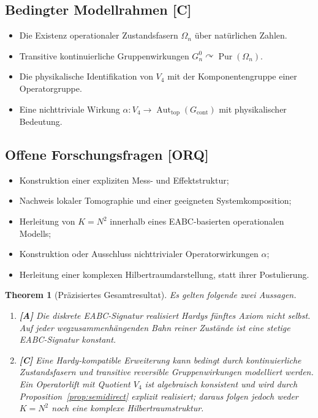 \documentclass[11pt,a4paper,reqno]{amsart}
\newtheorem{theorem}{Theorem}[section]
\theoremstyle{definition}
\theoremstyle{remark}
\newcommand{\Pur}{\operatorname{Pur}}
\newcommand{\Aut}{\operatorname{Aut}}
\newcommand{\StatusA}{\textnormal{\textbf{[A]}}}
\newcommand{\StatusC}{\textnormal{\textbf{[C]}}}
\newcommand{\StatusORQ}{\textnormal{\textbf{[ORQ]}}}
\begin{document}
\subsection*{Bedingter Modellrahmen \StatusC}
\begin{itemize}[leftmargin=2.2em]
  \item Die Existenz operationaler Zustandsfasern $\Omega_n$ über natürlichen Zahlen.
  \item Transitive kontinuierliche Gruppenwirkungen $G_n^0\curvearrowright\Pur(\Omega_n)$.
  \item Die physikalische Identifikation von $V_4$ mit der Komponentengruppe einer Operatorgruppe.
  \item Eine nichttriviale Wirkung $\alpha:V_4\to\Aut_{\mathrm{top}}(G_{\mathrm{cont}})$ mit physikalischer Bedeutung.
\end{itemize}

\subsection*{Offene Forschungsfragen \StatusORQ}
\begin{itemize}[leftmargin=2.2em]
  \item Konstruktion einer expliziten Mess- und Effektstruktur;
  \item Nachweis lokaler Tomographie und einer geeigneten Systemkomposition;
  \item Herleitung von $K=N^2$ innerhalb eines EABC-basierten operationalen Modells;
  \item Konstruktion oder Ausschluss nichttrivialer Operatorwirkungen $\alpha$;
  \item Herleitung einer komplexen Hilbertraumdarstellung, statt ihrer Postulierung.
\end{itemize}

\begin{theorem}[Präzisiertes Gesamtresultat]
\label{thm:conclusion}
Es gelten folgende zwei Aussagen.
\begin{enumerate}[label=\textup{(\arabic*)},leftmargin=2.5em]
  \item \StatusA{} Die diskrete EABC-Signatur realisiert Hardys fünftes Axiom nicht selbst. Auf jeder wegzusammenhängenden Bahn reiner Zustände ist eine stetige EABC-Signatur konstant.
  \item \StatusC{} Eine Hardy-kompatible Erweiterung kann bedingt durch kontinuierliche Zustandsfasern und transitive reversible Gruppenwirkungen modelliert werden. Ein Operatorlift mit Quotient $V_4$ ist algebraisch konsistent und wird durch Proposition~\ref{prop:semidirect} explizit realisiert; daraus folgen jedoch weder $K=N^2$ noch eine komplexe Hilbertraumstruktur.
\end{enumerate}
\end{theorem}
\end{document}
